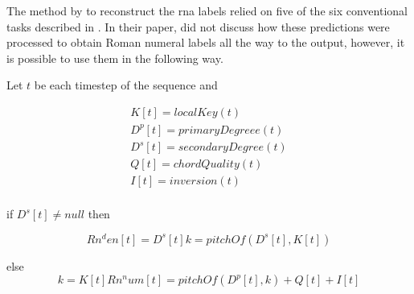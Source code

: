
The method by \textcite{chen2018functional} to reconstruct
the \gls{rna} labels relied on five of the six conventional
tasks described in . In their
paper, \textcite{chen2018functional} did not discuss how
these predictions were processed to obtain Roman numeral
labels all the way to the output, however, it is possible to
use them in the following way.

Let $t$ be each timestep of the sequence and

\begin{equation}
\begin{split}
K[t] = localKey(t) \\
D^p[t] = primaryDegree e(t) \\
D^s[t] = secondaryDegree(t)  \\
Q[t] = chordQuality(t) \\
I[t] = inversion(t) \\
\end{split}
\end{equation}

if $D^s[t] \neq null$ then

\begin{equation}
Rn^den[t] = D^s[t]
k = pitchOf(D^s[t], K[t])
\end{equation}

else
\begin{equation}
k = K[t]
Rn^num[t] = pitchOf(D^p[t], k) + Q[t] + I[t] 
\end{equation}
